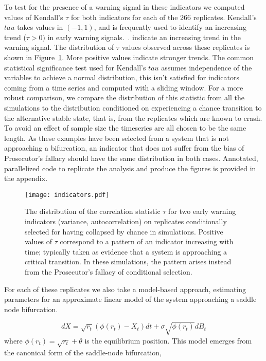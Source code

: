 \documentclass[authoryear,review,12pt]{elsarticle}
\begin{document}
To test for the presence of a warning signal in these indicators we computed
values of Kendall's $\tau$ for both indicators for each of the 266 replicates.
Kendall's $tau$ takes values in $(-1, 1)$, and is frequently used to identify
an increasing trend ($\tau > 0 )$ in early warning signals.~\citep{Dakos2008, Dakos2011}.
indicate an increasing trend in the warning signal.  The distribution of $\tau$ 
values observed across these replicates is shown in Figure~\ref{fig:indicator}.
More positive values indicate stronger trends. The common statistical significance
test used for Kendall's $tau$ assumes independence of the variables to achieve
a normal distribution, this isn't satisfied for indicators coming from a time 
series and computed with a sliding window.  For a more robust comparison, we 
compare the distribution of this statistic from all the simulations to the 
distribution conditioned on experiencing a chance transition to the alternative
stable state, that is, from the replicates which are known to crash.  To avoid 
an effect of sample size the timeseries are all chosen to be the same length.  
As these examples have been selected from a system that is not approaching a 
bifurcation, an indicator that does not suffer from the bias of Prosecutor's fallacy
should have the same distribution in both cases.   Annotated, parallelized code to 
replicate the analysis and produce the figures is provided in the appendix. 


\begin{figure}[H]
  \begin{center}
    \texttt{[image: indicators.pdf]}
  \end{center}
  \caption{The distribution of the correlation statistic $\tau$ for two early warning indicators (variance, autocorrelation) on replicates conditionally selected for having collapsed by chance in simulations. Positive values of $\tau$ correspond to a pattern of an indicator increasing with time; typically taken as evidence that a system is approaching a critical transition.  In these simulations, the pattern arises instead from the Prosecutor's fallacy of conditional selection.}
  \label{fig:indicator}
\end{figure}

For each of these replicates we also take a model-based approach, estimating 
parameters for an approximate linear model of the system approaching a
saddle node bifurcation.


\begin{equation}
  dX = \sqrt{ r_t } (\phi(r_t) - X_t) dt +
  \sigma\sqrt{\phi(r_t) } d B_t \label{LSN}
\end{equation}
where \( \phi(r_t) = \sqrt{r_t} +\theta \) is the equilibrium position.  
This model emerges from the canonical form of the saddle-node bifurcation,
\end{document}
